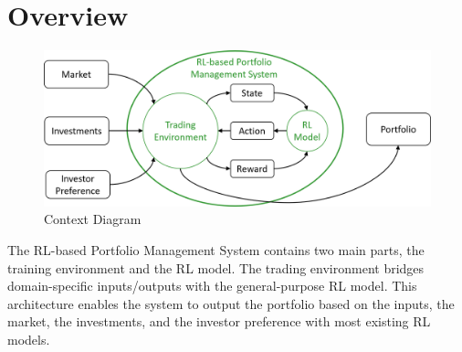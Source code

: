 \section{Overview}


\begin{figure}[h]
  \includegraphics[width=15cm]{images/context_diagram.png}
  \caption{Context Diagram}
  \label{fig:context_diagram}
\end{figure}
\par
The RL-based Portfolio Management System contains two main parts, the training environment and the RL model. The trading environment bridges domain-specific inputs/outputs with the general-purpose RL model. This architecture enables the system to output the portfolio based on the inputs, the market, the investments, and the investor preference with most existing RL models.
